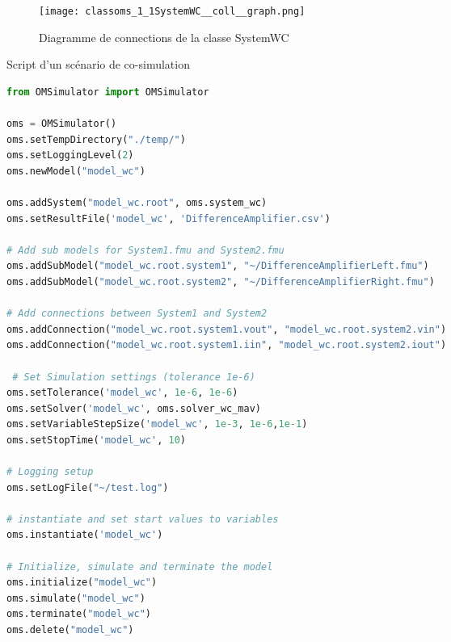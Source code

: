 \begin{figure}[hbt!]
    \centering
    \texttt{[image: classoms\_1\_1SystemWC\_\_coll\_\_graph.png]}
    \caption{Diagramme de connections de la classe SystemWC }
    \label{fig:A1}
\end{figure}

\newpage

\begin{table}[hbt!]
    \caption{Script d'un scénario de co-simulation}
    \begin{lstlisting}[style=vscode, language=python]
from OMSimulator import OMSimulator

oms = OMSimulator()
oms.setTempDirectory("./temp/")
oms.setLoggingLevel(2)        
oms.newModel("model_wc")
        
oms.addSystem("model_wc.root", oms.system_wc)
oms.setResultFile('model_wc', 'DifferenceAmplifier.csv')   

# Add sub models for System1.fmu and System2.fmu
oms.addSubModel("model_wc.root.system1", "~/DifferenceAmplifierLeft.fmu")
oms.addSubModel("model_wc.root.system2", "~/DifferenceAmplifierRight.fmu")
        
# Add connections between System1 and System2
oms.addConnection("model_wc.root.system1.vout", "model_wc.root.system2.vin")
oms.addConnection("model_wc.root.system1.iin", "model_wc.root.system2.iout")
        
 # Set Simulation settings (tolerance 1e-6)
oms.setTolerance('model_wc', 1e-6, 1e-6)
oms.setSolver('model_wc', oms.solver_wc_mav)
oms.setVariableStepSize('model_wc', 1e-3, 1e-6,1e-1)
oms.setStopTime('model_wc', 10)
        
# Logging setup
oms.setLogFile("~/test.log")
        
# instantiate and set start values to variables
oms.instantiate('model_wc')
        
# Initialize, simulate and terminate the model
oms.initialize("model_wc")
oms.simulate("model_wc")
oms.terminate("model_wc")
oms.delete("model_wc")    
        \end{lstlisting}
        \label{tab:A2}
\end{table}
\newpage

